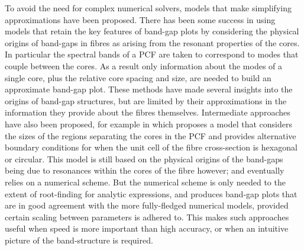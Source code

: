 To avoid the need for complex numerical solvers, models that make simplifying approximations have been proposed.
There has been some success in using models that retain the key features of band-gap plots by considering the physical origins of band-gaps in fibres as arising from the resonant properties of the cores.
In particular the spectral bands of a PCF are taken to correspond to modes that couple between the cores.
As a result only information about the modes of a single core, plus the relative core spacing and size, are needed to build an approximate band-gap plot.
These methods have made several insights into the origins of band-gap structures, but are limited by their approximations in the information they provide about the fibres themselves.
Intermediate approaches have also been proposed, for example in \cite{birks2006approximate} which proposes a model that considers the sizes of the regions separating the cores in the PCF and provides alternative boundary conditions for when the unit cell of the fibre cross-section is hexagonal or circular.
This model is still based on the physical origins of the band-gaps being due to resonances within the cores of the fibre however; and eventually relies on a numerical scheme.
But the numerical scheme is only needed to the extent of root-finding for analytic expressions, and produces band-gap plots that are in good agreement with the more fully-fledged numerical models, provided certain scaling between parameters is adhered to.
This makes such approaches useful when speed is more important than high accuracy, or when an intuitive picture of the band-structure is required. \newline

